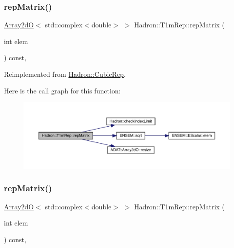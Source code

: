 \subsubsection{\texorpdfstring{repMatrix()}{repMatrix()}\hspace{0.1cm}{\footnotesize\ttfamily [1/3]}}
{\footnotesize\ttfamily \mbox{\hyperlink{classADAT_1_1Array2dO}{Array2dO}}$<$ std\+::complex$<$double$>$ $>$ Hadron\+::\+T1m\+Rep\+::rep\+Matrix (\begin{DoxyParamCaption}\item[{int}]{elem }\end{DoxyParamCaption}) const\hspace{0.3cm}{\ttfamily [inline]}, {\ttfamily [virtual]}}



Reimplemented from \mbox{\hyperlink{structHadron_1_1CubicRep_ac5d7e9e6f4ab1158b5fce3e4ad9e8005}{Hadron\+::\+Cubic\+Rep}}.

Here is the call graph for this function\+:
\nopagebreak
\begin{figure}[H]
\begin{center}
\leavevmode
\includegraphics[width=350pt]{de/dd9/structHadron_1_1T1mRep_a77a8ee94e1ed9406845c8d1106f73599_cgraph}
\end{center}
\end{figure}
\mbox{\label{structHadron_1_1T1mRep_a77a8ee94e1ed9406845c8d1106f73599}} 
\subsubsection{\texorpdfstring{repMatrix()}{repMatrix()}\hspace{0.1cm}{\footnotesize\ttfamily [2/3]}}
{\footnotesize\ttfamily \mbox{\hyperlink{classADAT_1_1Array2dO}{Array2dO}}$<$ std\+::complex$<$double$>$ $>$ Hadron\+::\+T1m\+Rep\+::rep\+Matrix (\begin{DoxyParamCaption}\item[{int}]{elem }\end{DoxyParamCaption}) const\hspace{0.3cm}{\ttfamily [inline]}, {\ttfamily [virtual]}}



